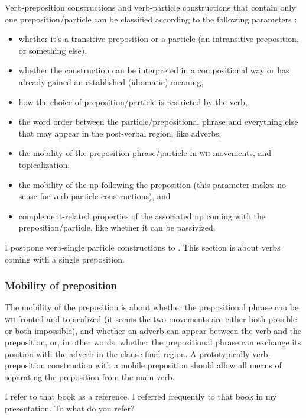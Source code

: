 \documentclass[UTF8, a4paper, oneside, scheme=plain, 12pt]{ctexbook}
\newcommand*{\citepages}[1]{pp.~{#1}}
\newcommand{\category}[1]{\textsc{#1}}
\newcommand{\formcat}[1]{\textsc{#1}}
\begin{document}
Verb-preposition constructions and verb-particle constructions
that contain only one preposition/particle
can be classified according to the following parameters
\citep[\citepages{272-274}]{cgel}:
\begin{itemize}
    \item whether it's a transitive preposition or a particle 
    (an intransitive preposition, or something else),
    \item whether the construction can be interpreted in a compositional way or 
    has already gained an established (idiomatic) meaning,
    \item how the choice of preposition/particle is restricted by the verb,  
    \item the word order between the particle/prepositional phrase and 
    everything else that may appear in the post-verbal region, like adverbs,  
    \item the mobility of the preposition phrase/particle 
    in \formcat{wh}-movements, and topicalization, 
    \item the mobility of the \acs{np} following the preposition 
    (this parameter makes no sense for verb-particle constructions), and 
    \item complement-related properties of the associated \acs{np} coming with the preposition/particle,
    like whether it can be passivized.
\end{itemize}

I postpone verb-single particle constructions to .
This section is about verbs coming with a single preposition.

\subsubsection{Mobility of preposition}

The mobility of the preposition is about
whether the prepositional phrase can be \category{wh}-fronted and topicalized
(it seems the two movements are either both possible or both impossible),
and whether an adverb can appear 
between the verb and the preposition, 
or, in other words, whether the prepositional phrase can exchange its position with the adverb 
in the clause-final region. 
A prototypically verb-preposition construction with a mobile preposition
should allow all means of separating the preposition from the main verb.

\begin{exe}
    \ex I refer to that book as a reference.
    \ex\label{ex:clause.preposition.after-adjunct.1} I referred frequently to that book in my presentation.
    \ex To what do you refer?
\end{exe}
\end{document}
